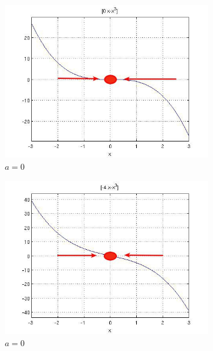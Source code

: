 \documentclass[12pt]{article}
\newenvironment{myenv}{\begin{adjustwidth}{1cm}{}}{\end{adjustwidth}}
\begin{document}
\begin{myenv}
\begin{figure} [H]
    \centering
    \includegraphics[width=0.8\textwidth]{a0}
    \caption{ $ a = 0$}
    \label{figure:a0}
\end{figure}

\begin{figure} [H]
    \centering
    \includegraphics[width=0.8\textwidth]{anegative4}
    \caption{ $ a = 0$}
    \label{figure:a0}
\end{figure}

\end{myenv}
\end{document}
